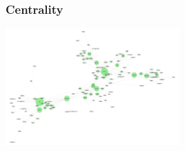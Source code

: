\documentclass[10pt,twocolumn,letterpaper]{article}
\begin{document}
\subsubsection{Centrality}


\begin{center}
    \includegraphics[width=0.5\textwidth]{img/s5/pagerank_graph.jpg}
\end{center}
\end{document}
